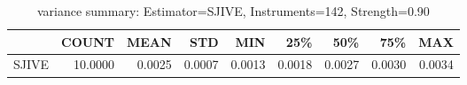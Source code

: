 \begin{table}[ht]
\centering
\caption{variance summary: Estimator=SJIVE, Instruments=142, Strength=0.90}
\begin{tabular}{lrrrrrrrr}
\toprule
 & COUNT & MEAN & STD & MIN & 25\% & 50\% & 75\% & MAX \\
\midrule
SJIVE & 10.0000 & 0.0025 & 0.0007 & 0.0013 & 0.0018 & 0.0027 & 0.0030 & 0.0034 \\
\bottomrule
\end{tabular}
\end{table}
